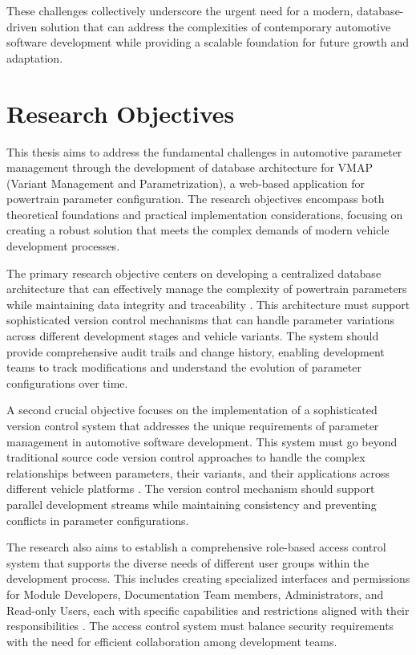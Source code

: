 These challenges collectively underscore the urgent need for a modern, database-driven solution that can address the complexities of contemporary automotive software development while providing a scalable foundation for future growth and adaptation.

\section{Research Objectives}
\label{sec:objectives}

This thesis aims to address the fundamental challenges in automotive parameter management through the development of database architecture for VMAP (Variant Management and Parametrization), a web-based application for powertrain parameter configuration. The research objectives encompass both theoretical foundations and practical implementation considerations, focusing on creating a robust solution that meets the complex demands of modern vehicle development processes.

The primary research objective centers on developing a centralized database architecture that can effectively manage the complexity of powertrain parameters while maintaining data integrity and traceability \cite{williams2004web}. This architecture must support sophisticated version control mechanisms that can handle parameter variations across different development stages and vehicle variants. The system should provide comprehensive audit trails and change history, enabling development teams to track modifications and understand the evolution of parameter configurations over time.

A second crucial objective focuses on the implementation of a sophisticated version control system that addresses the unique requirements of parameter management in automotive software development. This system must go beyond traditional source code version control approaches to handle the complex relationships between parameters, their variants, and their applications across different vehicle platforms \cite{staron2021automotive}. The version control mechanism should support parallel development streams while maintaining consistency and preventing conflicts in parameter configurations.

The research also aims to establish a comprehensive role-based access control system that supports the diverse needs of different user groups within the development process. This includes creating specialized interfaces and permissions for Module Developers, Documentation Team members, Administrators, and Read-only Users, each with specific capabilities and restrictions aligned with their responsibilities \cite{sandhu1998role}. The access control system must balance security requirements with the need for efficient collaboration among development teams.

